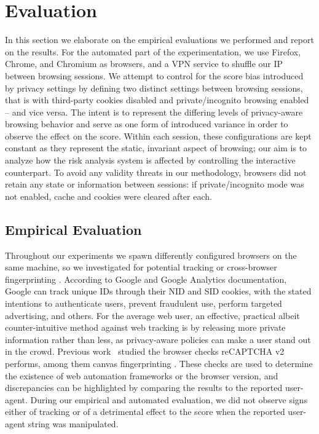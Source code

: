 \section{Evaluation}
\label{sec:evaluationrere}

In this section we elaborate on the empirical evaluations we performed and report on the results.
For the automated part of the experimentation, we use Firefox, Chrome, and Chromium as browsers, and a VPN service to shuffle our IP between browsing sessions.
We attempt to control for the score bias introduced by privacy settings by defining two distinct settings between browsing sessions, that is with third-party cookies disabled and private/incognito browsing enabled -- and vice versa.
The intent is to represent the differing levels of privacy-aware browsing behavior and serve as one form of introduced variance in order to observe the effect on the score.
Within each session, these configurations are kept constant as they represent the static, invariant aspect of browsing; our aim is to analyze how the risk analysis system is affected by controlling the interactive counterpart.
To avoid any validity threats in our methodology, browsers did not retain any state or information between sessions: if private/incognito mode was not enabled, cache and cookies were cleared after each.

\subsection{Empirical Evaluation}
\label{sub:empirical}

Throughout our experiments we spawn differently configured browsers on the same machine, so we investigated for potential tracking or cross-browser fingerprinting \cite{boda2011user}.
According to Google and Google Analytics documentation, Google can track unique IDs through their NID and SID cookies, with the stated intentions to authenticate users, prevent fraudulent use, perform targeted advertising, and others.
For the average web user, an effective, practical albeit counter-intuitive method against web tracking is by releasing more private information rather than less, as privacy-aware policies can make a user stand out in the crowd.
Previous work~\cite{sivakorn2016robot} studied the browser checks reCAPTCHA v2 performs, among them canvas fingerprinting \cite{mowery2012pixel}.
These checks are used to determine the existence of web automation frameworks or the browser version, and discrepancies can be highlighted by comparing the results to the reported user-agent.
During our empirical and automated evaluation, we did not observe signs either of tracking or of a detrimental effect to the score when the reported user-agent string was manipulated.

